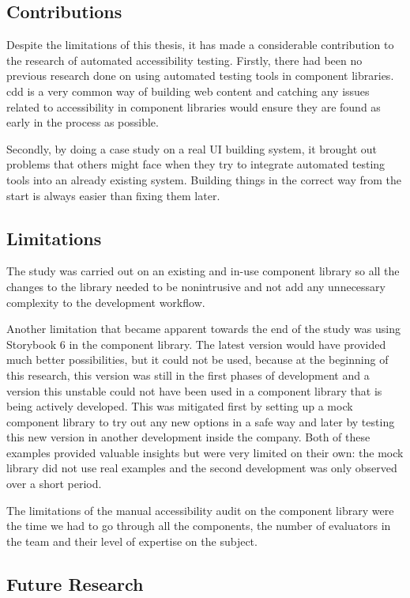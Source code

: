 \documentclass{master_thesis}
\begin{document}
\subsection{Contributions}

Despite the limitations of this thesis, it has made a considerable contribution to the research of automated accessibility testing. Firstly, there had been no previous research done on using automated testing tools in component libraries. \ac{cdd} is a very common way of building web content and catching any issues related to accessibility in component libraries would ensure they are found as early in the process as possible.

Secondly, by doing a case study on a real UI building system, it brought out problems that others might face when they try to integrate automated testing tools into an already existing system. Building things in the correct way from the start is always easier than fixing them later.

\subsection{Limitations}

The study was carried out on an existing and in-use component library so all the changes to the library needed to be nonintrusive and not add any unnecessary complexity to the development workflow.

Another limitation that became apparent towards the end of the study was using Storybook 6 in the component library. The latest version would have provided much better possibilities, but it could not be used, because at the beginning of this research, this version was still in the first phases of development and a version this unstable could not have been used in a component library that is being actively developed. This was mitigated first by setting up a mock component library to try out any new options in a safe way and later by testing this new version in another development inside the company. Both of these examples provided valuable insights but were very limited on their own: the mock library did not use real examples and the second development was only observed over a short period.

The limitations of the manual accessibility audit on the component library were the time we had to go through all the components, the number of evaluators in the team and their level of expertise on the subject.

\subsection{Future Research}
\end{document}
